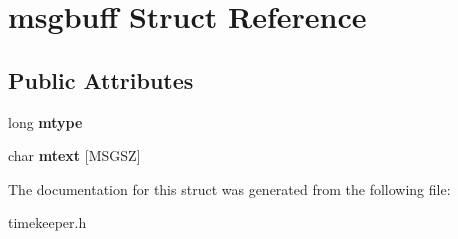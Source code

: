 \hypertarget{structmsgbuff}{\section{msgbuff \-Struct \-Reference}
\label{structmsgbuff}
}
\subsection*{\-Public \-Attributes}
\begin{DoxyCompactItemize}
\item 
\hypertarget{structmsgbuff_ac831c8048f5b0d1475f897937abf3ea9}{long {\bfseries mtype}}\label{structmsgbuff_ac831c8048f5b0d1475f897937abf3ea9}

\item 
\hypertarget{structmsgbuff_a4a455262c798976b20b27264083bc98d}{char {\bfseries mtext} \mbox{[}\-M\-S\-G\-S\-Z\mbox{]}}\label{structmsgbuff_a4a455262c798976b20b27264083bc98d}

\end{DoxyCompactItemize}


\-The documentation for this struct was generated from the following file\-:\begin{DoxyCompactItemize}
\item 
timekeeper.\-h\end{DoxyCompactItemize}
